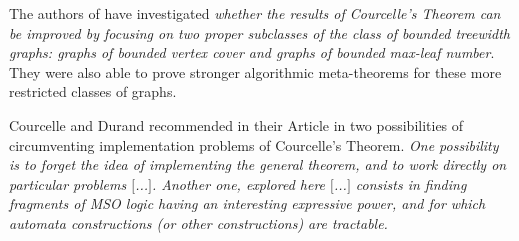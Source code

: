 \documentclass[a4paper, 12pt, bibliography=totoc]{scrartcl}
\begin{document}
The authors of \cite{MetatheoremsforRestrictionsofTreewidth} have investigated \textit{whether the results of Courcelle's Theorem can be improved by focusing on two proper subclasses of the class of bounded treewidth graphs: graphs of bounded vertex cover and graphs of bounded max-leaf number}. They were also able to prove stronger algorithmic meta-theorems for these more restricted classes of graphs. 

Courcelle and Durand recommended in their Article in \cite{FiniteAutomata10} two possibilities of circumventing implementation problems of Courcelle's Theorem. \textit{One possibility is to forget the idea of implementing the general theorem, and to work directly on particular problems $[$...$]$. Another one, explored here $[$...$]$ consists in finding fragments of MSO logic having an interesting expressive power, and for which automata constructions (or other constructions) are tractable.}
%

%
\end{document}

